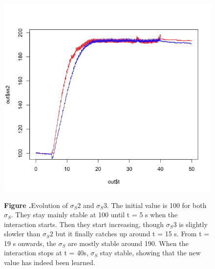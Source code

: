 \documentclass{report}
\begin{document}
\begin{figure}[h!]
\begin{center}
\includegraphics[width=15cm]{figures/oscillator_ss.png}
\end{center}
 \textbf{\label{fig:05} Figure .}{Evolution of $\sigma_S2$ and $\sigma_S3$. The initial value is 100 for both $\sigma_S$. They stay mainly stable at 100 until t = 5 s when the interaction starts. Then they start increasing, though $ \sigma_S3$ is slightly slowler than $\sigma_S2$ but it finally catches up around t = 15 s. From t = 19 s onwards, the $\sigma_S$ are mostly stable around 190. When the interaction stops at  t = 40s, $\sigma_S$ stay stable, showing that the new value has indeed been learned.}
\end{figure}
\end{document}
